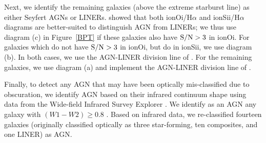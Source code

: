 Next, we identify the remaining galaxies (above the extreme starburst line) as either Seyfert AGNs or LINERs. \citet{Kewley2006} showed that both ion{O}{i}/H$\alpha$ and  ion{S}{ii}/H$\alpha$ diagrams are better-suited to distinguish AGN from LINERs; we thus use diagram (c) in Figure~\ref{BPT} if these galaxies also have $\rm S/N>3$ in ion{O}{i}. For galaxies which do not have $\rm S/N>3$ in ion{O}{i}, but do in ion{S}{ii}, we use diagram (b). In both cases, we use the AGN-LINER division line of \citet{Kewley2006}. For the remaining galaxies, we use diagram (a) and implement the AGN-LINER division line of \citet{Schawinski2007}.

Finally, to detect any AGN that may have been optically mis-classified due to obscuration, we identify AGN based on their infrared continuum shape using data from the Wide-field Infrared Survey Explorer \citep[WISE]{Wright2010}. We identify as an AGN any galaxy with $(W1-W2) \ge 0.8$ \citep{Stern2012}. Based on infrared data, we re-classified fourteen galaxies (originally classified optically as three star-forming, ten composites, and one LINER) as AGN. 

